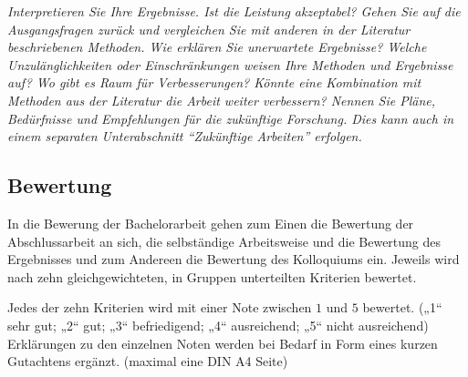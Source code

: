  \emph{Interpretieren Sie Ihre Ergebnisse. Ist die Leistung akzeptabel? Gehen Sie auf die Ausgangsfragen zurück und vergleichen Sie mit anderen in der Literatur beschriebenen Methoden. Wie erklären Sie unerwartete Ergebnisse? Welche Unzulänglichkeiten oder Einschränkungen weisen Ihre Methoden und Ergebnisse auf? Wo gibt es Raum für Verbesserungen? Könnte eine Kombination mit Methoden aus der Literatur die Arbeit weiter verbessern? Nennen Sie Pläne, Bedürfnisse und Empfehlungen für die zukünftige Forschung. Dies kann auch in einem separaten Unterabschnitt ``Zukünftige Arbeiten'' erfolgen.}
 
 
 \subsection*{Bewertung}


In die Bewerung der Bachelorarbeit gehen zum Einen die Bewertung der Abschlussarbeit an sich, die selbständige Arbeitsweise und die Bewertung des Ergebnisses und zum Andereen die Bewertung des Kolloquiums ein. Jeweils wird nach zehn gleichgewichteten, in Gruppen unterteilten Kriterien bewertet.



Jedes der zehn Kriterien wird mit einer Note zwischen $1$ und $5$ bewertet. („1“ sehr gut; „2“ gut; „3“ befriedigend; „4“ ausreichend; „5“ nicht ausreichend)  Erklärungen zu den einzelnen Noten werden bei Bedarf in Form eines kurzen Gutachtens ergänzt. (maximal eine DIN A4 Seite)


